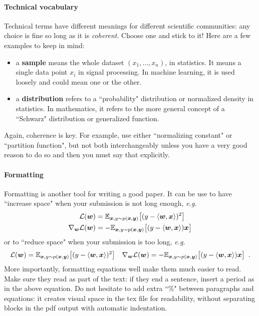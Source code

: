 \paragraph{Technical vocabulary} Technical terms have different meanings for different scientific communities: any choice is fine so long as it is \textit{coherent}. Choose one and stick to it! Here are a few examples to keep in mind:
%
\begin{itemize}
    
    \item[] a \textbf{sample}
    means the whole dataset $(x_1, \ldots, x_n)$, in statistics. It means a single data point $x_i$ in signal processing. In machine learning, it is used loosely and could mean one or the other.

    \item[] a \textbf{distribution}
    refers to a ``probability" distribution or normalized density in statistics. In mathematics, it refers to the more general concept of a ``Schwarz" distribution or generalized function.

\end{itemize}
%
Again, coherence is key. For example, use either ``normalizing constant" or ``partition function", but not both interchangeably unless you have a very good reason to do so and then you must say that explicitly. 

\paragraph{Formatting} Formatting is another tool for writing a good paper. It can be use to have ``increase space" when your submission is not long enough, \textit{e.g.}
%
\begin{align*}
    \mathcal{L}({\bm{w}}) 
    & =
    \mathbb{E}_{{\bm{x}}, y \sim p({\bm{x}}, {\bm{y}})} \big[ 
    (y - \langle {\bm{w}}, {\bm{x}} \rangle)^2 
    \big]
    \\
    \nabla_{{\bm{w}}} \mathcal{L}({\bm{w}}) 
    & =
    -\mathbb{E}_{{\bm{x}}, y \sim p({\bm{x}}, {\bm{y}})} \big[ 
    (y - \langle {\bm{w}}, {\bm{x}} \rangle) {\bm{x}}
    \big]
\end{align*}
%
or to ``reduce space" when your submission is too long, \textit{e.g.}
%
\begin{alignat*}{2}
    \mathcal{L}({\bm{w}}) 
    =
    \mathbb{E}_{{\bm{x}}, y \sim p({\bm{x}}, {\bm{y}})} \big[ 
    (y - \langle {\bm{w}}, {\bm{x}} \rangle)^2 
    \big]
    \hspace{1em}
    \nabla_{{\bm{w}}} \mathcal{L}({\bm{w}}) 
    =
    -\mathbb{E}_{{\bm{x}}, y \sim p({\bm{x}}, {\bm{y}})} \big[ 
    (y - \langle {\bm{w}}, {\bm{x}} \rangle) {\bm{x}}
    \big]
    \enspace .
\end{alignat*}
%
More importantly, formatting equations well make them much easier to read. Make sure they read as part of the text: if they end a sentence, insert a period as in the above equation. Do not hesitate to add extra ``\%" between paragraphs and equations: it creates visual space in the tex file for readability, without separating blocks in the pdf output with automatic indentation. 


